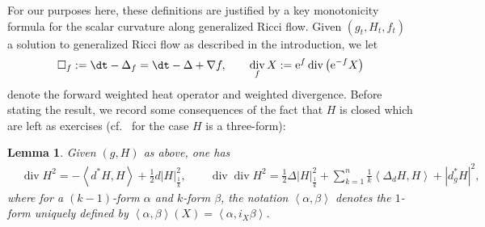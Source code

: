 \documentclass[11pt]{article}
\numberwithin{equation}{section}
\numberwithin{equation}{section}
\newtheorem{Lemma}[thm]{Lemma}
\newcommand{\brs}[1]{\left| #1 \right|}
\newcommand{\gD}{\Delta}
\newcommand{\ga}{\alpha}
\newcommand{\gb}{\beta}
\newcommand{\N}{\nabla}
\newcommand{\IP}[1]{\left<#1\right>}
\newcommand{\wnorm}[1]{\left|#1\right|^2_{\frac1k}}
\DeclareMathOperator{\divg}{div}
\begin{document}
For our purposes here, these definitions are justified by a key monotonicity formula for the scalar curvature along generalized Ricci flow. Given $(g_t, H_t, f_t)$ a solution to generalized Ricci flow as described in the introduction, we let
\begin{align*}
\square_f := \dt - \gD_f = \dt - \gD + \N f, \qquad \divg_f X := {\rm e}^{f} \divg \big({\rm e}^{-f} X\big)
\end{align*}
denote the forward weighted heat operator and weighted divergence. Before stating the result, we record some consequences of the fact that $H$ is closed which are left as exercises (cf.\ \cite[Lemma~3.19]{GRFbook} for the case $H$ is a three-form):
\begin{Lemma} \label{l:HBianchi} Given $(g, H)$ as above, one has
\begin{align*}
& \divg H^2 = - \IP{d^* H, H} + \frac{1}{2} d \wnorm{H},\qquad
 \divg \divg H^2 = \frac{1}{2} \gD \wnorm{H} + \sum_{k=1}^n \frac{1}{k} \IP{\gD_d H, H} + \brs{d^*_g H}^2,
\end{align*}
where for a $(k-1)$-form $\ga$ and $k$-form $\gb$, the notation $\IP{\ga, \gb}$ denotes the $1$-form uniquely defined by $\IP{\ga,\gb}(X) = \IP{\ga, i_X \gb}$.
\end{Lemma}
\end{document}
